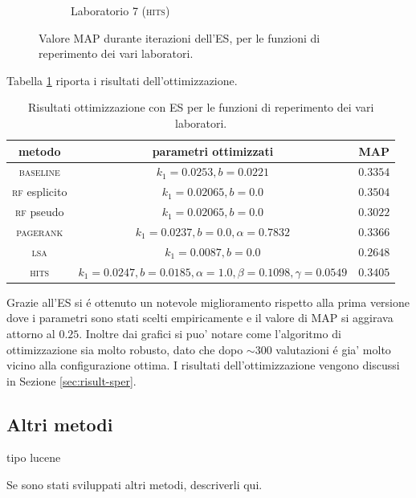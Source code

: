 \begin{figure}
\begin{subfigure}[htpb]{0.475\textwidth}
            \caption[]%
            {{\small Laboratorio 7 (\textsc{hits})}}    
            \label{fig:es_lab7}
        \end{subfigure}
        \caption[ The average and standard deviation of critical parameters ]
        {\small Valore MAP durante iterazioni dell'ES, per le funzioni di reperimento dei vari laboratori.} 
        \label{fig:es_all}
\end{figure}
Tabella \ref{tab:es} riporta i risultati dell'ottimizzazione.
\begin{table}[htpb]

\begin{center}
\begin{tabular}{|c|c|c|}
\hline
metodo & parametri ottimizzati & MAP \\
 \hline
\textsc{baseline} & $k_1 = 0.0253, b = 0.0221$ & $0.3354$ \\
\textsc{rf} esplicito & $k_1 = 0.02065, b = 0.0$ & $0.3504$ \\
\textsc{rf} pseudo & $k_1 = 0.02065, b = 0.0$ & $0.3022$ \\
\textsc{pagerank} & $k_1 = 0.0237, b = 0.0, \alpha=0.7832$ & $0.3366$ \\
\textsc{lsa} & $k_1 = 0.0087, b = 0.0$ & $0.2648$ \\
\textsc{hits} & $k_1 = 0.0247, b = 0.0185, \alpha=1.0, \beta=0.1098, \gamma=0.0549$ & $0.3405$ \\
\hline
\end{tabular}
\end{center}
\caption{Risultati ottimizzazione con ES per le funzioni di reperimento dei vari laboratori.}
\label{tab:es}
\end{table}

Grazie all'ES si \'e ottenuto un notevole miglioramento rispetto alla prima versione dove i parametri sono stati scelti empiricamente e il valore di MAP si aggirava attorno al $0.25$. Inoltre dai grafici si puo' notare come l'algoritmo di ottimizzazione sia molto robusto, dato che dopo $\sim{300}$ valutazioni \'e gia' molto vicino alla configurazione ottima. I risultati dell'ottimizzazione vengono discussi in Sezione \ref{sec:risult-sper}.

\subsection{Altri metodi}
tipo lucene
\label{sec:altri-metodi}

Se sono stati sviluppati altri metodi, descriverli qui.

